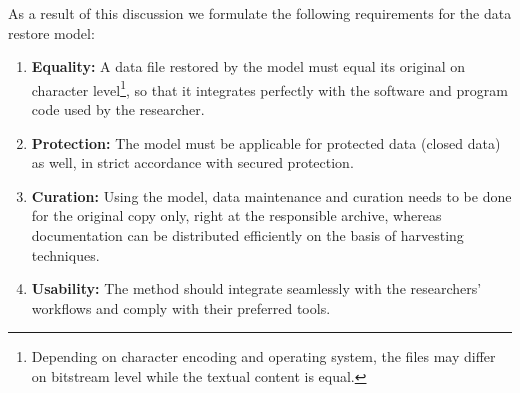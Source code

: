 \documentclass{acm_proc_article-sp}
\begin{document}
As a result of this discussion we formulate the following requirements for the data restore model:



\begin{enumerate}\label{reqlist}
	
  \item \textbf{Equality:} A data file restored by the model must equal its original on character level\footnote{Depending on character encoding and operating system, the files may differ on bitstream level while the textual content is equal.}, so that it integrates perfectly with the software and program code used by the researcher.
  
  \item \textbf{Protection:} The model must be applicable for protected data (closed data) as well, in strict accordance with secured protection.
 
  \item \textbf{Curation:} Using the model, data maintenance and curation needs to be done for the original copy only, right at the responsible archive, whereas documentation can be distributed efficiently on the basis of harvesting techniques.

  
  \item \textbf{Usability:} The method should integrate seamlessly with the researchers' workflows and comply with their preferred tools. 
  

\end{enumerate}
\end{document}
